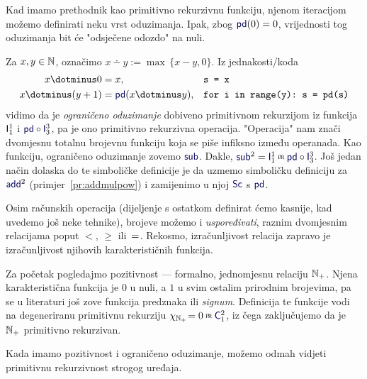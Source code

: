 Kad imamo prethodnik kao primitivno rekurzivnu funkciju, njenom iteracijom mo\-že\-mo definirati neku vrst oduzimanja. Ipak, zbog $\f{pd}(0)=0$, vrijednosti tog oduzimanja bit će "odsječene odozdo" na nuli.

\begin{primjer}[{name=[primitivna rekurzivnost ograničenog oduzimanja]}]\label{pr:sub}
Za $x,y\in{\mathbb N}$, označimo $x\dotminus y:=\max\,\{x-y,0\}$. Iz jednakosti\slash koda
\begin{align}
	x\dotminus0&=x\text,&&\texttt{s = x}\\
	x\dotminus(y+1)&=\f{pd}(x\dotminus y)\text,&&\texttt{for i in range(y):~s = pd(s)}
\end{align}
vidimo da je \emph{ograničeno oduzimanje} dobiveno primitivnom rekurzijom iz funkcija $\f I_1^1$ i $\f{pd}\circ\f I_3^3$, pa je ono primitivno rekurzivna operacija. "Operacija" nam znači dvomjesnu totalnu brojevnu funkciju koja se piše infiksno između operanada. Kao funkciju, ograničeno oduzimanje zovemo $\f{sub}$. Dakle, $\f{sub}^2=\f I_1^1\pr\f{pd}\circ\f I_3^3$. Još jedan način dolaska do te simboličke definicije je da uzmemo simboličku definiciju za $\f{add}^2$ (primjer~\ref{pr:addmulpow}) i zamijenimo u njoj $\f{Sc}$ s $\f{pd}$.
\end{primjer}

Osim računskih operacija (dijeljenje s ostatkom definirat ćemo kasnije, kad uvedemo još neke tehnike), brojeve možemo i \emph{uspoređivati}, raznim dvomjesnim relacijama poput $<$, $\ge$ ili~$=$. Rekosmo, izračunljivost relacija zapravo je izračunljivost njihovih karakterističnih funkcija.

\begin{primjer}[{name=[primitivna rekurzivnost pozitivnosti]}]\label{pr:N+prn}
Za početak pogledajmo pozitivnost --- formalno, jednomjesnu relaciju ${\mathbb N}_+$. Njena karakteristična funkcija je $0$ u nuli, a $1$ u svim ostalim prirodnim brojevima, pa se u literaturi još zove funkcija predznaka ili \emph{signum}. Definicija te funkcije vodi na degeneriranu primitivnu rekurziju $\chi_{\N_+}\!=0\pr\f C_1^2$, iz čega zaključujemo da je ${\mathbb N}_+$ primitivno rekurzivan.
\end{primjer}

Kada imamo pozitivnost i ograničeno oduzimanje, možemo odmah vidjeti primitivnu rekurzivnost strogog uređaja. %

